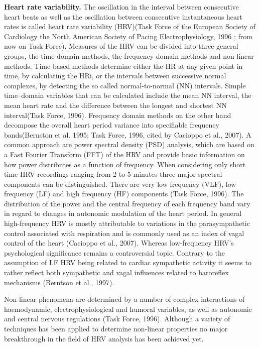 \textbf{Heart rate variability.} The oscillation in the interval between consecutive heart beats as well as the oscillation between consecutive instantaneous heart rates is called heart rate variability (HRV)(Task Force of the European Society of Cardiology the North American Society of Pacing Electrophysiology, 1996 ; from now on Task Force).
Measures of the HRV can be divided into three general groups, the time domain methods, the frequency domain methods and non-linear methods. Time based methods determine either the HR at any given point in time, by calculating the HRi, or the intervals between successive normal complexes, by detecting the so called normal-to-normal (NN) intervals.
Simple time–domain variables that can be calculated include the mean NN interval, the mean heart rate and the
difference between the longest and shortest NN interval(Task Force, 1996). Frequency domain methods on the other hand decompose the overall heart period variance into specifiable frequency bands(Bernston et al. 1995; Task Force, 1996, cited by Cacioppo et al., 2007). A common approach are power spectral density (PSD) analysis, which are based on a Fast Fourier Transform (FFT) of the HRV and provide basic information on how power distributes as a function of frequency. When considering only short time HRV recordings ranging from 2 to 5 minutes three major spectral components can be distinguished. There are very low frequency (VLF), low frequency (LF) and high frequency (HF) components (Task Force, 1996). The distribution of the power and the central frequency of each frequency band vary in regard to changes in autonomic modulation of the heart period. In general high-frequency HRV is mostly attributable to variations in the parasympathetic control associated with respiration and is commonly used as an index of vagal control of the heart (Cacioppo et al., 2007). Whereas low-frequency HRV's psychological significance remains a controversial topic. Contrary to the assumption of LF HRV being related to cardiac sympathetic activity it seems to rather  reflect both sympathetic and vagal influences related to baroreflex mechanisms (Berntson et al., 1997).

Non-linear phenomena are determined by a number of complex interactions of haemodynamic, electrophysiological and humoral variables, as well as autonomic and central nervous regulations (Task Force, 1996). Although a  variety of techniques has been applied to determine non-linear properties no major breakthrough in the field of HRV analysis has been achieved yet. 


